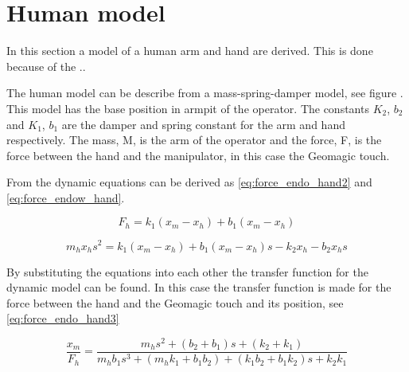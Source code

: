 \section{Human model}
In this section a model of a human arm and hand are derived. This is done because of the ..

The human model can be describe from a mass-spring-damper model, see figure . This model has the base position in armpit of the operator. The constants $K_2$, $b_2$ and $K_1$, $b_1$ are the damper and spring constant for the arm and hand respectively. The mass, M, is the arm of the operator and the force, F, is the force between the hand and the manipulator, in this case the Geomagic touch.




From  the dynamic equations can be derived as \eqref{eq:force_endo_hand2} and \eqref{eq:force_endow_hand}.

\begin{equation}
F_h = k_1(x_m-x_h)+b_1(x_m-x_h)
\label{eq:force_endo_hand2}
\end{equation}

\begin{equation}
m_hx_hs^2 = k_1(x_m-x_h)+b_1(x_m-x_h)s-k_2x_h-b_2x_hs
\label{eq:force_endow_hand}
\end{equation}

By substituting the equations into each other the transfer function for the dynamic model can be found. In this case the transfer function is made for the force between the hand and the Geomagic touch and its position, see \eqref{eq:force_endo_hand3}

\begin{equation}
\frac{x_m}{F_h} = \frac{m_hs^2+(b_2+b_1)s+(k_2+k_1)}{m_hb_1s^3+(m_hk_1+b_1b_2)+(k_1b_2+b_1k_2)s+k_2k_1}
\label{eq:force_endo_hand3}
\end{equation}